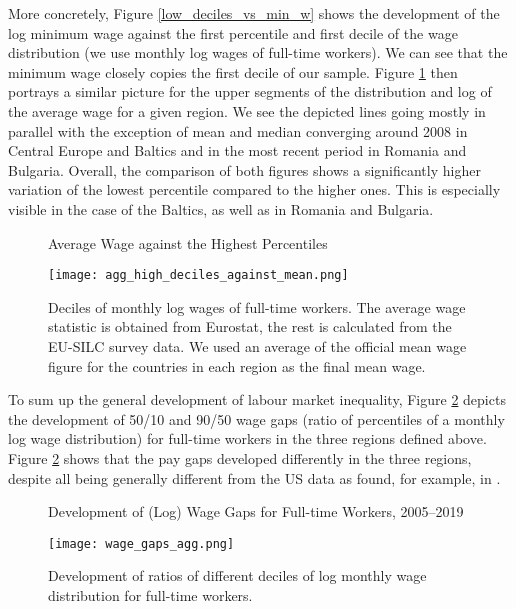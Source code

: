 \documentclass[11pt]{article}
\begin{document}
More concretely, Figure \ref{low_deciles_vs_min_w} shows the development of the log minimum wage against the first percentile and first decile of the wage distribution (we use monthly log wages of full-time workers). We can see that the minimum wage closely copies the first decile of our sample. Figure \ref{high_deciles_vs_meam_w} then portrays a similar picture for the upper segments of the distribution and log of the average wage for a given region. We see the depicted lines going mostly in parallel with the exception of mean and median converging around 2008 in Central Europe and Baltics and in the most recent period in Romania and Bulgaria. Overall, the comparison of both figures shows a significantly higher variation of the lowest percentile compared to the higher ones. This is especially visible in the case of the Baltics, as well as in Romania and Bulgaria.

\begin{figure}[!htbp]%
    \centering
    \caption{Average Wage against the Highest Percentiles}
    {\texttt{[image: agg\_high\_deciles\_against\_mean.png]} }
    \label{high_deciles_vs_meam_w}
    \caption*{\footnotesize Deciles of monthly log wages of full-time workers. The average wage statistic is obtained from Eurostat, the rest is calculated from the EU-SILC survey data. We used an average of the official mean wage figure for the countries in each region as the final mean wage.}
\end{figure}

To sum up the general development of labour market inequality, Figure \ref{agg_wage_gaps_CEE} depicts the development of  50/10 and 90/50 wage gaps (ratio of percentiles of a monthly log wage distribution) for full-time workers in the three regions defined above.
Figure \ref{agg_wage_gaps_CEE} shows that the pay gaps developed differently in the three regions, despite all being generally different from the US data as found, for example, in \citet{mishel2013assessing}. 

\begin{figure}[!htbp]%
    \centering
    \caption{Development of (Log) Wage Gaps for Full-time Workers,  2005–2019}
    {\texttt{[image: wage\_gaps\_agg.png]} }
    \label{agg_wage_gaps_CEE}
    \caption*{\footnotesize Development of ratios of different deciles of log monthly wage distribution for full-time workers. }
\end{figure}
\end{document}

